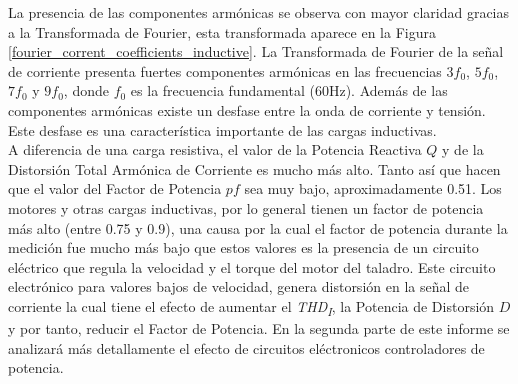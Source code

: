 \documentclass[journal]{IEEEtran}
\begin{document}
La presencia de las componentes armónicas se observa 
con mayor claridad gracias a la Transformada de Fourier, 
esta transformada aparece en la Figura 
\ref{fourier_corrent_coefficients_inductive}.
La Transformada de Fourier de la señal de corriente 
presenta fuertes componentes armónicas en las frecuencias
$3 f_0$, $5 f_0$, $7 f_0$  y $9 f_0$, donde $f_0$ es la 
frecuencia fundamental (60Hz). Además de las componentes 
armónicas existe un desfase entre la onda de corriente 
y tensión. Este desfase es una característica importante 
de las cargas inductivas. \\


A diferencia de una carga resistiva, el valor de la 
Potencia Reactiva $Q$ y de la Distorsión Total Armónica 
de Corriente es mucho más alto. Tanto así que hacen 
que el valor del Factor de Potencia $pf$ sea muy bajo, 
aproximadamente 0.51. Los motores y otras cargas 
inductivas, por lo general tienen un factor de potencia 
más alto (entre 0.75 y 0.9), una causa por la cual el 
factor de potencia durante la medición fue mucho más 
bajo que estos valores es la presencia de un circuito 
eléctrico que regula la velocidad y el torque del 
motor del taladro. Este circuito electrónico para 
valores bajos de velocidad, genera distorsión en la 
señal de corriente la cual tiene el efecto de  
aumentar el \textit{THD\textsubscript{I}}, la Potencia 
de Distorsión $D$ y por tanto, reducir el Factor de 
Potencia. En la segunda parte de este informe se analizará
más detallamente el efecto de circuitos eléctronicos 
controladores de potencia. 

\end{document}
